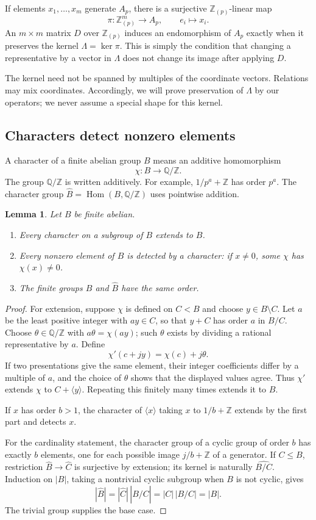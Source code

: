 \documentclass[11pt]{article}
\numberwithin{equation}{section}
\newtheorem{lemma}[theorem]{Lemma}
\theoremstyle{definition}
\theoremstyle{remark}
\newcommand{\Z}{\mathbb Z}
\newcommand{\Q}{\mathbb Q}
\newcommand{\Rloc}{\mathbb Z_{(p)}}
\newcommand{\Hom}{\operatorname{Hom}}
\newcommand{\ip}[1]{\langle #1\rangle}
\begin{document}
If elements $x_1,\ldots,x_m$ generate $A_p$, there is a surjective $\Rloc$-linear map
\[
\pi:\Rloc^m\longrightarrow A_p,\qquad e_i\longmapsto x_i.
\]
An $m\times m$ matrix $D$ over $\Rloc$ induces an endomorphism of $A_p$ exactly when it preserves the kernel $\Lambda=\ker\pi$. This is simply the condition that changing a representative by a vector in $\Lambda$ does not change its image after applying $D$.

The kernel need not be spanned by multiples of the coordinate vectors. Relations may mix coordinates. Accordingly, we will prove preservation of $\Lambda$ by our operators; we never assume a special shape for this kernel.

\subsection{Characters detect nonzero elements}
A character of a finite abelian group $B$ means an additive homomorphism
\[
\chi:B\longrightarrow\Q/\Z.
\]
The group $\Q/\Z$ is written additively. For example, $1/p^a+\Z$ has order $p^a$. The character group $\widehat B=\Hom(B,\Q/\Z)$ uses pointwise addition.

\begin{lemma}\label{lem:characterfacts}
Let $B$ be finite abelian.
\begin{enumerate}
\item Every character on a subgroup of $B$ extends to $B$.
\item Every nonzero element of $B$ is detected by a character: if $x\ne0$, some $\chi$ has $\chi(x)\ne0$.
\item The finite groups $B$ and $\widehat B$ have the same order.
\end{enumerate}
\end{lemma}
\begin{proof}
For extension, suppose $\chi$ is defined on $C<B$ and choose $y\in B\setminus C$. Let $a$ be the least positive integer with $ay\in C$, so that $y+C$ has order $a$ in $B/C$. Choose $\theta\in\Q/\Z$ with $a\theta=\chi(ay)$; such $\theta$ exists by dividing a rational representative by $a$. Define
\[
\chi'(c+jy)=\chi(c)+j\theta.
\]
If two presentations give the same element, their integer coefficients differ by a multiple of $a$, and the choice of $\theta$ shows that the displayed values agree. Thus $\chi'$ extends $\chi$ to $C+\ip y$. Repeating this finitely many times extends it to $B$.

If $x$ has order $b>1$, the character of $\ip x$ taking $x$ to $1/b+\Z$ extends by the first part and detects $x$.

For the cardinality statement, the character group of a cyclic group of order $b$ has exactly $b$ elements, one for each possible image $j/b+\Z$ of a generator. If $C\le B$, restriction $\widehat B\to\widehat C$ is surjective by extension; its kernel is naturally $\widehat{B/C}$. Induction on $|B|$, taking a nontrivial cyclic subgroup when $B$ is not cyclic, gives
\[
|\widehat B|=|\widehat C|\,|\widehat{B/C}|=|C|\,|B/C|=|B|.
\]
The trivial group supplies the base case.
\end{proof}
\end{document}
